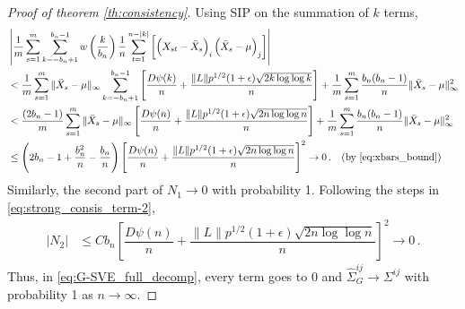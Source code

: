 \documentclass[11pt]{article}
\theoremstyle{remark}
\begin{document}
\begin{proof}[Proof of theorem \ref{th:consistency}]
Using SIP on the summation of $k$ terms,
\begin{align*}
    & \left|\dfrac{1}{m}\sum_{s=1}^{m}\sum_{k=-b_n+1}^{b_n-1}w\left(\dfrac{k}{b_n}\right)\dfrac{1}{n}\sum_{t=1}^{n-|k|}\left[ \left(X_{st} - \bar{X}_s \right)_i  \left(\bar{X}_s - \mu \right)_j \right] \right|\\
   &  < \dfrac{1}{m}\sum\limits_{s=1}^{m}\|\bar{X}_s - \mu\|_{\infty}\sum\limits_{k=-b_n + 1}^{b_n-1}\left[ \dfrac{D \psi(k)}{n} + \dfrac{\|L\| p^{1/2}(1+\epsilon)\sqrt{2k \log\log k}}{n}  \right] + \dfrac{1}{m}\sum\limits_{s=1}^{m} \dfrac{b_n(b_n-1)}{n}\|\bar{X}_s - \mu\|_{\infty}^2\\
   &  < \dfrac{(2b_n-1)}{m}\sum\limits_{s=1}^{m}\|\bar{X}_s - \mu\|_{\infty}\left[ \dfrac{D \psi(n)}{n} + \dfrac{\|L\| p^{1/2}(1+\epsilon)\sqrt{2n \log\log n}}{n}  \right] + \dfrac{1}{m}\sum\limits_{s=1}^{m} \dfrac{b_n(b_n-1)}{n}\|\bar{X}_s - \mu\|_{\infty}^2 \\
   &  \leq   \left(2b_n - 1 + \dfrac{b_n^2}{n} - \dfrac{b_n}{n}\right)\left[ \dfrac{D \psi(n)}{n} + \dfrac{\|L\| p^{1/2}(1+\epsilon)\sqrt{2n \log\log n}}{n}  \right]^2  \to 0\,. \quad  \text{(by \eqref{eq:xbars_bound})}
\end{align*}
%
% 
%
%
Similarly, the second part of $N_1 \to 0$ with probability 1. 
%
Following the steps in \eqref{eq:strong_consis_term-2}, 
\begin{align*}
    |N_2| & \leq Cb_n\left[ \dfrac{D \psi(n)}{n} + \dfrac{\|L\| p^{1/2}(1+\epsilon)\sqrt{2n \log\log n}}{n}  \right]^2  \to 0\,.
\end{align*}
Thus, in \eqref{eq:G-SVE_full_decomp}, every term goes to 0 and $\hat{\Sigma}_{G}^{ij} \to \Sigma^{ij}$ with probability 1 as $n \to \infty$. 
\end{proof}
\end{document}
